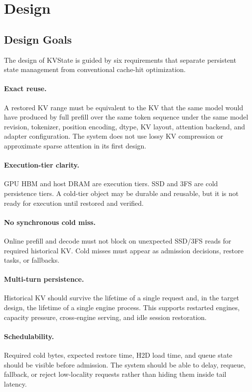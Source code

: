 \documentclass[sigconf,review,anonymous]{acmart}
\newcommand{\system}{KVState\xspace}
\begin{document}
\section{Design}

\subsection{Design Goals}

The design of \system is guided by six requirements that separate persistent
state management from conventional cache-hit optimization.

\paragraph{Exact reuse.} A restored KV range must be equivalent to the KV that
the same model would have produced by full prefill over the same token sequence
under the same model revision, tokenizer, position encoding, dtype, KV layout,
attention backend, and adapter configuration. The system does not use lossy KV
compression or approximate sparse attention in its first design.

\paragraph{Execution-tier clarity.} GPU HBM and host DRAM are execution tiers.
SSD and 3FS are cold persistence tiers. A cold-tier object may be durable and
reusable, but it is not ready for execution until restored and verified.

\paragraph{No synchronous cold miss.} Online prefill and decode must not block
on unexpected SSD/3FS reads for required historical KV. Cold misses must appear
as admission decisions, restore tasks, or fallbacks.

\paragraph{Multi-turn persistence.} Historical KV should survive the lifetime
of a single request and, in the target design, the lifetime of a single engine
process. This supports restarted engines, capacity pressure, cross-engine
serving, and idle session restoration.

\paragraph{Schedulability.} Required cold bytes, expected restore time, H2D load
time, and queue state should be visible before admission. The system should be
able to delay, requeue, fallback, or reject low-locality requests rather than
hiding them inside tail latency.
\end{document}
